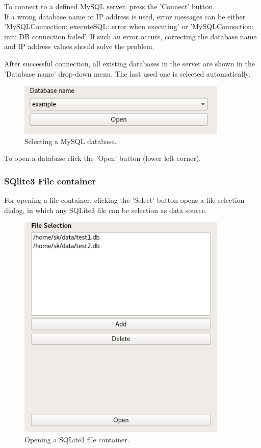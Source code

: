 \documentclass[10pt,letterpaper,extrafontsizes]{memoir}
\begin{document}
To connect to a defined MySQL server, press the 'Connect' button.\\

If  a  wrong  database  name  or  IP  address  is  used,  error  messages  can  be  either  'MySQLConnection: executeSQL: error when executing' or 'MySQLConnection:  init:  DB connection failed'.  If such an error occurs, correcting the database name and IP address values should solve the problem.

After successful connection, all existing databases in the server are shown in the 'Database name' drop-down menu. The last used one is selected automatically.

\begin{figure}[H]
  \center
    \includegraphics[width=10cm]{../screenshots/mysql_database_selection.png}
  \caption{Selecting a MySQL database.}
  \label{fig:mysql_db_select}
\end{figure}


To open a database click the 'Open' button (lower left corner).

\subsubsection{SQlite3 File container}
For opening a file container, clicking the 'Select' button opens a file selection dialog, in which any SQLite3 file can be selection as data source.

\begin{figure}[H]
  \center
    \includegraphics[width=10cm]{../screenshots/sqlite3_open.png}
  \caption{Opening a SQLite3 file container.}
  \label{fig:sqlite3_open}
\end{figure}
\end{document}
